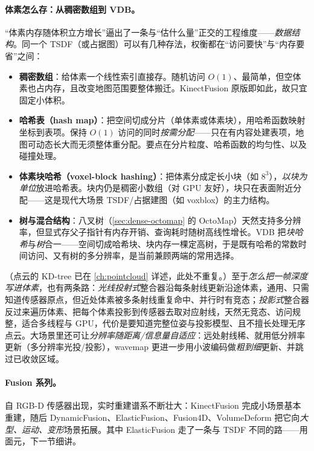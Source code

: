\paragraph{体素怎么存：从稠密数组到 VDB。}
“体素内存随体积立方增长”逼出了一条与“估什么量”正交的工程维度——\emph{数据结构}。同一个 TSDF（或占据图）可以有几种存法，权衡都在“访问要快”与“内存要省”之间\cite{carlone2026handbook}：
\begin{itemize}
  \item \textbf{稠密数组}：给体素一个线性索引直接存。随机访问 $O(1)$、最简单，但空体素也占内存，且改变地图范围要整体搬迁。KinectFusion 原版即如此，故只宜固定小体积。
  \item \textbf{哈希表（hash map）}：把空间切成分片（单体素或体素块），用哈希函数映射坐标到表项。保持 $O(1)$ 访问的同时\emph{按需分配}——只在有内容处建表项，地图可动态长大而无须整体重分配。要点在分片粒度、哈希函数的均匀性、以及碰撞处理。
  \item \textbf{体素块哈希（voxel-block hashing）}：把体素分成定长小块（如 $8^3$），\emph{以块为单位}放进哈希表\cite{niessner2013voxelhashing}。块内仍是稠密小数组（对 GPU 友好），块只在表面附近分配——这是现代大场景 TSDF/占据建图（如 voxblox）的主力结构。
  \item \textbf{树与混合结构}：八叉树（\cref{sec:dense-octomap} 的 OctoMap）天然支持多分辨率，但显式存父子指针有内存开销、查询耗时随树高线性增长。VDB\cite{museth2013vdb} 把\emph{块哈希}与\emph{树}合一——空间切成哈希块、块内存一棵定高树，于是既有哈希的常数时间访问、又有树的多分辨率，是当前兼顾两端的常用选择。
\end{itemize}
（点云的 KD-tree 已在 \cref{ch:pointcloud} 详述，此处不重复。）至于\emph{怎么把一帧深度写进体素}，也有两条路：\emph{光线投射式}整合器沿每条射线更新沿途体素，通用、只需知道传感器原点，但近处体素被多条射线重复命中、并行时有竞态；\emph{投影式}整合器反过来遍历体素、把每个体素投影到传感器去取对应射线，天然无竞态、访问规整，适合多线程与 GPU，代价是要知道完整位姿与投影模型、且不擅长处理无序点云。大场景里还可让\emph{分辨率随距离/信息量自适应}：远处射线稀、就用低分辨率更新（多分辨率光投/投影），wavemap\cite{reijgwart2023wavemap} 更进一步用小波编码做\emph{粗到细}更新、并跳过已收敛区域。

\paragraph{Fusion 系列。}
自 RGB-D 传感器出现，实时重建谱系不断壮大：KinectFusion 完成小场景基本重建，随后 DynamicFusion、ElasticFusion、Fusion4D、VolumeDeform 把它向\emph{大型、运动、变形}场景拓展。其中 ElasticFusion 走了一条与 TSDF 不同的路——用面元，下一节细讲。

